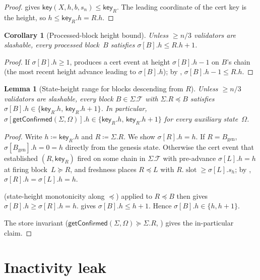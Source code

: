 \ifx\litemode\undefined\documentclass{article}\fi
\newcommand{\genesis}{\ensuremath{B_{\mathrm{gen}}}}
\newcommand{\T}[0]{\ensuremath{\mathcal{T}}}
\newcommand{\slot}[0]{\ensuremath{\operatorname{\mathrm{slot}}}}
\newcommand{\key}{\mathsf{key}}
\newcommand{\getConfirmed}{\textsf{getConfirmed}\xspace}
\theoremstyle{plain}
\newtheorem{corollary}{Corollary}
\newtheorem{lemma}{Lemma}
\theoremstyle{definition}
\theoremstyle{remark}
\begin{document}
\begin{proof}
 gives $\key(X, h, b, s_n) \leq \key_R$. The leading coordinate of the cert key is the height, so $h \leq \key_R.h = R.h$.
\end{proof}

\begin{corollary}[Processed-block height bound]\label{rev:cor:processed-height-bound}
Unless $\geq n/3$ validators are slashable, every processed block~$B$ satisfies $\sigma[B].h \leq R.h + 1$.
\end{corollary}

\begin{proof}
If $\sigma[B].h \geq 1$,  produces a cert event at height $\sigma[B].h - 1$ on $B$'s chain (the most recent height advance leading to $\sigma[B].h$); by , $\sigma[B].h - 1 \leq R.h$.
\end{proof}

\begin{lemma}[State-height range for blocks descending from $R$]\label{rev:lem:confirmed-h-range}
Unless $\geq n/3$ validators are slashable, every block $B \in \Sigma.\T$ with $\Sigma.R \preceq B$ satisfies $\sigma[B].h \in \{\key_R.h,\, \key_R.h + 1\}$. In particular, $\sigma[\getConfirmed(\Sigma, \Omega)].h \in \{\key_R.h,\, \key_R.h + 1\}$ for every auxiliary state~$\Omega$.
\end{lemma}

\begin{proof}
Write $h \coloneqq \key_R.h$ and $R \coloneqq \Sigma.R$. We show $\sigma[R].h = h$. If $R = \genesis$, $\sigma[\genesis].h = 0 = h$ directly from the genesis state. Otherwise the cert event that established $(R, \key_R)$ fired on some chain in $\Sigma.\T$ with pre-advance $\sigma[L].h = h$ at firing block~$L \succeq R$, and freshness places $R \preceq L$ with $R.\slot \geq \sigma[L].s_h$; by , $\sigma[R].h = \sigma[L].h = h$.

 (state-height monotonicity along $\preceq$) applied to $R \preceq B$ then gives $\sigma[B].h \geq \sigma[R].h = h$.  gives $\sigma[B].h \leq h+1$. Hence $\sigma[B].h \in \{h, h+1\}$.

The store invariant ($\getConfirmed(\Sigma, \Omega) \succeq \Sigma.R$, ) gives the in-particular claim.
\end{proof}

\section{Inactivity leak}
\end{document}
